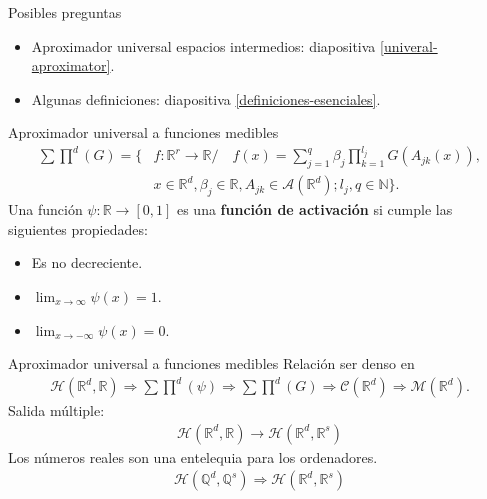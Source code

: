 \documentclass{beamer}
\newcommand{\R}{\mathbb{R}}
\newcommand{\N}{\mathbb{N}}
\newcommand{\Q}{\mathbb{Q}}
\newcommand{\afines}{\mathcal{A}(\R^d)}
\newcommand{\pmcg}{ \sum \prod^d (G)} %
\newcommand{\fC}{\mathcal{C}(\R^d)} %
\newcommand{\fM}{\mathcal{M}(\R^d)} %
\newcommand{\rrnn}{ \mathcal{H}(\R^d,\R)} %
\newcommand{\rrnng}{ \sum \prod^d (\psi)} %
\newcommand{\rrnnmc}{ \mathcal{H}(\R^d,\R^s)}
\begin{document}
\begin{frame}{Posibles preguntas}
    \begin{itemize}
        \item Aproximador universal espacios intermedios: diapositiva \ref{univeral-aproximator}.
        \item Algunas definiciones: diapositiva \ref{definiciones-esenciales}.
    \end{itemize}
    
\end{frame}
\begin{frame}{Aproximador universal a funciones medibles}
    \label{definiciones-esenciales}
    \begin{align*} 
        \sum \prod^d(G) = \{ 
        &f: \R^r \longrightarrow \R / \quad
        f(x) = \sum_{j = 1} ^q  \beta_j \prod_{k=1}^{l_j}
        G(A_{jk}(x)), \\
        &x  \in \R^d, \beta_j \in \R, A_{jk}\in \afines; l_j,q \in \N
        \}.
    \end{align*} 
    Una función  $\psi: \R \longrightarrow [0,1]$ 
    es una \textbf{ función de activación} 
    si  cumple las siguientes propiedades:
    \begin{itemize}
        \item Es no decreciente.
        \item $\lim _{x \rightarrow \infty} \psi(x) = 1$.
        \item $\lim _{x \rightarrow -\infty} \psi(x) = 0$.
    \end{itemize}   
\end{frame}

\begin{frame}{Aproximador universal a funciones medibles}
    \label{univeral-aproximator}
    Relación ser denso en 
    \begin{align*}
        \rrnn 
            \Rightarrow  
        \rrnng 
            \Rightarrow
        \pmcg
            \Rightarrow  
        \fC    
            \Rightarrow 
        \fM .
    \end{align*}
    Salida múltiple: 
    \begin{align*}
        \rrnn 
            \longrightarrow 
        \rrnnmc
    \end{align*}
    Los números reales son una entelequia para los ordenadores. 
    \begin{align*}
       \mathcal{H}(\Q^d, \Q^s)
            \Rightarrow
        \rrnnmc
    \end{align*}
\end{frame}
\end{document}
